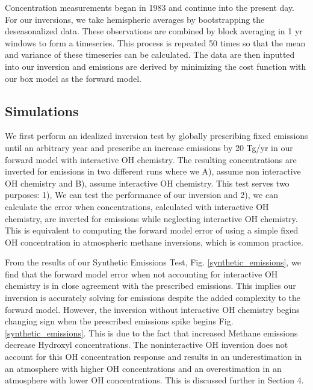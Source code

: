 \documentclass[two column,grl]{AGUTeX}
\begin{document}
\begin{article}
Concentration measurements began in 1983 and continue into the present day. For our inversions, we take hemispheric averages by bootstrapping the deseasonalized data. These observations are combined by block averaging in 1 yr windows to form a timeseries. This process is repeated 50 times so that the mean and variance of these timeseries can be calculated. The data are then inputted into our inversion and emissions are derived by minimizing the cost function with our box model as the forward model.


\subsection{Simulations}
We first perform an idealized inversion test by globally prescribing fixed emissions until an arbitrary year and prescribe an increase emissions by 20 Tg/yr in our forward model with interactive OH chemistry. The resulting concentrations are inverted for emissions in two different runs where we A), assume non interactive OH chemistry and B), assume interactive OH chemistry. This test serves two purposes: 1), We can test the performance of our inversion and 2), we can calculate the error when concentrations, calculated with interactive OH chemistry, are inverted for emissions while neglecting interactive OH chemistry. This is equivalent to computing the forward model error of using a simple fixed OH concentration in atmospheric methane inversions, which is common practice.

From the results of our Synthetic Emissions Test, Fig. \ref{synthetic_emissions}, we find that the forward model error when not accounting for interactive OH chemistry is in close agreement with the prescribed emissions. This implies our inversion is accurately solving for emissions despite the added complexity to the forward model. However, the inversion without interactive OH chemistry begins changing sign when the prescribed emissions spike begins Fig. \ref{synthetic_emissions}. This is due to the fact that increased Methane emissions decrease Hydroxyl concentrations. The noninteractive OH inversion does not account for this OH concentration response and results in an underestimation in an atmosphere with higher OH concentrations and an overestimation in an atmosphere with lower OH concentrations. This is discussed further in Section 4. 


\end{article}
\end{document}
